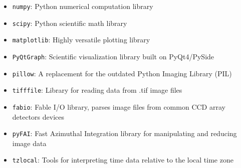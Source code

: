 \begin{itemize}
\item \verb|numpy|: Python numerical computation library
\item \verb|scipy|: Python scientific math library
\item \verb|matplotlib|: Highly versatile plotting library 
\item \verb|PyQtGraph|: Scientific visualization library built on PyQt4/PySide
\item \verb|pillow|: A replacement for the outdated Python Imaging Library (PIL)
\item \verb|tifffile|: Library for reading data from .tif image files 
\item \verb|fabio|: Fable I/O library, parses image files from common CCD array detectors devices
\item \verb|pyFAI|: Fast Azimuthal Integration library for manipulating and reducing image data 
\item \verb|tzlocal|: Tools for interpreting time data relative to the local time zone
\end{itemize}



